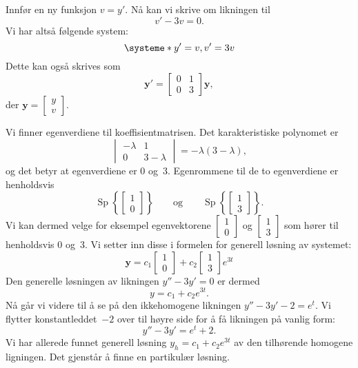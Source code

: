 \documentclass[notitlepage,a4paper,12pt,norsk]{IMFeksamen}
\DeclareMathOperator{\Sp}{Sp}
\newcommand{\V}[1]{\mathbf{#1}}
\newcommand{\vv}[2]{\begin{bmatrix} #1 \\ #2 \end{bmatrix}}
\newcommand{\vvS}[2]{\left[ \begin{smallmatrix} #1 \\ #2 \end{smallmatrix} \right]}
\newcommand{\0}{\V{0}}
\newcommand{\oppgslutt}{
\begin{center}
\pgfornament[width=6cm]{88}
\end{center}
}
\newenvironment{losning}{\begin{oppgave}}{\oppgslutt\end{oppgave}}
\begin{document}
\begin{losning}
Innfør en ny funksjon $v=y'$.
Nå kan vi skrive om likningen til 
\[
v'-3v=0.
\]
Vi har altså følgende system:
\[
\systeme*{
y'=v,
v'=3v
}
\]
Dette kan også skrives som
\[
\V{y}'=\begin{bmatrix}
0 & 1\\
0 & 3
\end{bmatrix}\V{y},
\]
der $\V{y}=\vv{y}{v}$.

Vi finner egenverdiene til koeffisientmatrisen.
Det karakteristiske polynomet er
\[
\begin{vmatrix}
-\lambda & 1\\
0 & 3-\lambda
\end{vmatrix}
= -\lambda(3-\lambda),
\]
og det betyr at egenverdiene er $0$ og~$3$. 
Egenrommene til de to egenverdiene er henholdsvis
\[
\Sp \left\{ \vv{1}{0} \right\}
\qquad\text{og}\qquad
\Sp \left\{ \vv{1}{3} \right\}.
\]
Vi kan dermed velge for eksempel egenvektorene
$\vvS{1}{0}$ og $\vvS{1}{3}$ som hører til henholdsvis $0$ og~$3$.
Vi setter inn disse i formelen for generell løsning av systemet:
\[
\V{y} = c_1\vv{1}{0}+c_2\vv{1}{3}e^{3t}
\]
Den generelle løsningen av likningen $y'' - 3y' = 0$ er dermed
\[
y = c_1 + c_2 e^{3t}.
\]
Nå går vi videre til å se på den ikkehomogene likningen 
$y''-3y'-2 = e^t$.
Vi flytter konstantleddet~$-2$ over til høyre side for å få
likningen på vanlig form:
\[
y''-3y' = e^t+2.
\]
Vi har allerede funnet generell løsning
$y_h = c_1 + c_2 e^{3t}$
av den tilhørende homogene ligningen.
Det gjenstår å finne en partikulær løsning.



\end{losning}
\end{document}
